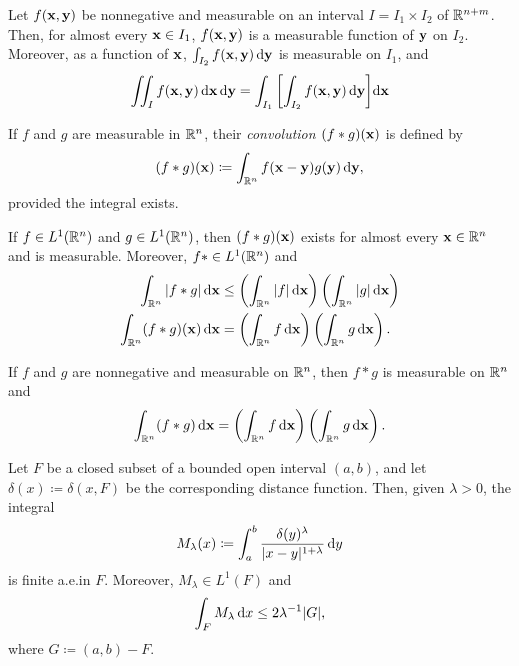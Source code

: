 \begin{theorem*}
Let $f(\mathbf{x},\mathbf{y})$ be nonnegative and measurable on an interval
$I=I_1\times I_2$ of $\mathbb{R}^{n+m}$. Then, for almost every $\mathbf{x}\in I_1$,
$f(\mathbf{x},\mathbf{y})$ is a measurable function of $\mathbf{y}$ on $I_2$. Moreover, as a
function of $\mathbf{x}$, $\int_{I_2}f(\mathbf{x},\mathbf{y})\mathop{}\!\mathrm{d} \mathbf{y}$ is measurable on
$I_1$, and
\[
\iint_I f(\mathbf{x},\mathbf{y})\mathop{}\!\mathrm{d}\mathbf{x}\mathop{}\!\mathrm{d}\mathbf{y}=\int_{I_1}\left[\int_{I_2}f(\mathbf{x},\mathbf{y})\mathop{}\!\mathrm{d}\mathbf{y}\right]\!\mathop{}\!\mathrm{d}\mathbf{x}
\]
\end{theorem*}
If $f$ and $g$ are measurable in $\mathbb{R}^n$, their \emph{convolution
  $(f*g)(\mathbf{x})$} is defined by
\[
(f*g)(\mathbf{x})\coloneqq\int_{\mathbb{R}^n}f(\mathbf{x}-\mathbf{y})g(\mathbf{y})\mathop{}\!\mathrm{d}\mathbf{y},
\]
provided the integral exists.
\begin{theorem*}[6.14]
If $f\in L^1(\mathbb{R}^n)$ and $g\in L^1(\mathbb{R}^n)$, then $(f*g)(\mathbf{x})$ exists for
almost every $\mathbf{x}\in\mathbb{R}^n$ and is measurable. Moreover, $f*\in
L^1(\mathbb{R}^n)$ and
\[
\begin{aligned}
\int_{\mathbb{R}^n}|f*g|\mathop{}\!\mathrm{d}\mathbf{x}
&\leq\left(\int_{\mathbb{R}^n}|f|\mathop{}\!\mathrm{d}\mathbf{x}\right)\left(\int_{\mathbb{R}^n}|g|\mathop{}\!\mathrm{d}\mathbf{x}\right)\\
\int_{\mathbb{R}^n}(f*g)(\mathbf{x})\mathop{}\!\mathrm{d}\mathbf{x}
&=\left(\int_{\mathbb{R}^n}f\mathop{}\!\mathrm{d}\mathbf{x}\right)\left(\int_{\mathbb{R}^n}g\mathop{}\!\mathrm{d}\mathbf{x}\right).
\end{aligned}
\]
\end{theorem*}
\begin{corollary*}[6.16]
If $f$ and $g$ are nonnegative and measurable on $\mathbb{R}^n$, then $f*g$ is
measurable on $\mathbb{R}^n$ and
\[
\int_{\mathbb{R}^n}(f*g)\mathop{}\!\mathrm{d}\mathbf{x}=
\left(\int_{\mathbb{R}^n} f\mathop{}\!\mathrm{d}\mathbf{x}\right)
\left(\int_{\mathbb{R}^n}g\mathop{}\!\mathrm{d}\mathbf{x}\right).
\]
\end{corollary*}
\begin{theorem*}[6.17, Marcinkiewicz]
Let $F$ be a closed subset of a bounded open interval $(a,b)$, and let
$\delta(x)\coloneqq\delta(x,F)$ be the corresponding distance
function. Then, given $\lambda>0$, the integral
\[
M_\lambda(x)\coloneqq\int_a^b\frac{\delta(y)^\lambda}{|x-y|^{1+\lambda}}\mathop{}\!\mathrm{d} y
\]
is finite a.e.\@ in $F$. Moreover, $M_\lambda\in L^1(F)$ and
\[
\int_F M_\lambda\mathop{}\!\mathrm{d} x\leq 2\lambda^{-1}|G|,
\]
where $G\coloneqq(a,b)\minus F$.
\end{theorem*}

